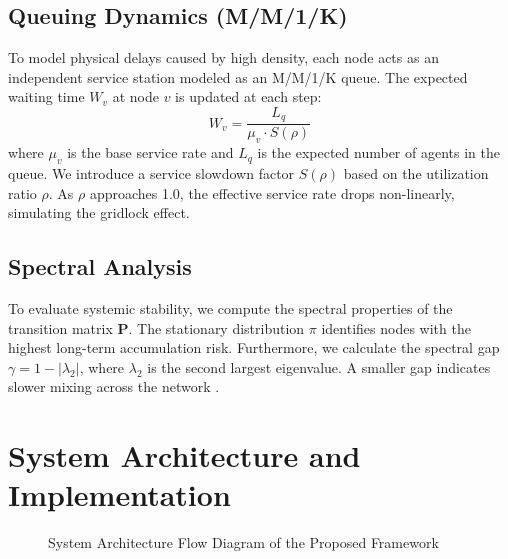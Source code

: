 \documentclass[conference]{IEEEtran}
\begin{document}
\subsection{Queuing Dynamics (M/M/1/K)}
To model physical delays caused by high density, each node acts as an independent service station modeled as an M/M/1/K queue. The expected waiting time $W_v$ at node $v$ is updated at each step:
\begin{equation}
W_v = \frac{L_q}{\mu_v \cdot S(\rho)}
\end{equation}
where $\mu_v$ is the base service rate and $L_q$ is the expected number of agents in the queue. We introduce a service slowdown factor $S(\rho)$ based on the utilization ratio $\rho$. As $\rho$ approaches 1.0, the effective service rate drops non-linearly, simulating the gridlock effect.

\subsection{Spectral Analysis}
To evaluate systemic stability, we compute the spectral properties of the transition matrix $\mathbf{P}$. The stationary distribution $\pi$ identifies nodes with the highest long-term accumulation risk. Furthermore, we calculate the spectral gap $\gamma = 1 - |\lambda_2|$, where $\lambda_2$ is the second largest eigenvalue. A smaller gap indicates slower mixing across the network \cite{b5}.

\section{System Architecture and Implementation}

\begin{figure}[htbp]
\centering
{}
\caption{System Architecture Flow Diagram of the Proposed Framework}
\label{fig:flow}
\end{figure}
\end{document}
